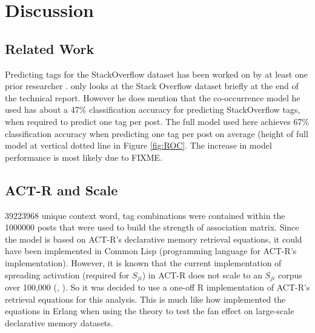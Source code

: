 \documentclass[10pt,letterpaper]{article}
\begin{document}
\section{Discussion}

\subsection{Related Work}
Predicting tags for the StackOverflow dataset has been worked on by at least one prior researcher \cite{Kuo2011}.
 only looks at the Stack Overflow dataset briefly at the end of the technical report.
However he does mention that the co-occurrence model he used has about a 47\% classification accuracy for predicting StackOverflow tags, when required to predict one tag per post.
The full model used here achieves 67\% classification accuracy when predicting one tag per post on average (height of full model at vertical dotted line in Figure \ref{fig:ROC}.
The increase in model performance is most likely due to FIXME.

\subsection{ACT-R and Scale}
\num{39223968} unique context word, tag combinations were contained within the \num{1000000} posts that were used to build the strength of association matrix.
Since the model is based on ACT-R's declarative memory retrieval equations, it could have been implemented in Common Lisp (programming language for ACT-R's implementation).
However, it is known that the current implementation of spreading activation (required for $S_{ji}$) in ACT-R does not scale to an $S_{ji}$ corpus over 100,000 (, ).
So it was decided to use a one-off R implementation of ACT-R's retrieval equations for this analysis.
This is much like how  implemented the equations in Erlang when using the theory to test the fan effect on large-scale declarative memory datasets.
\end{document}
